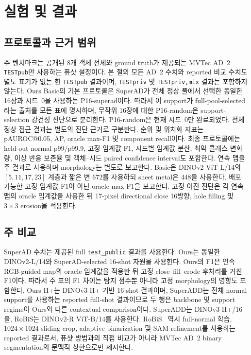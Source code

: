 \section{실험 및 결과}
\label{sec:experiments}


\subsection{프로토콜과 근거 범위}

주 벤치마크는 공개된 8개 객체 전체와 ground truth가 제공되는
MVTec AD~2 \texttt{TESTpub}만 사용하는 퓨샷 설정이다. 본 절의 모든 AD~2
수치와 reported 비교 수치도 별도 표기가 없는 한 \texttt{TESTpub} 결과이며,
\texttt{TESTpriv} 및 \texttt{TESTpriv,mix} 결과는 포함하지 않는다.
Ours Basic의 기본 프로토콜은 SuperAD가 전체 정상 풀에서 선택한 동일한 16장과
시드~0을 사용하는 P16-superad이다. 따라서 이 support가 full-pool-selected라는
출처를 모든 표에 명시하며, 무작위 16장에 대한 P16-random은 support-selection
강건성 진단으로 분리한다. P16-random은 현재 시드~0만 완료되었다. 전체 정상
접근 결과는 별도의 진단 근거로 구분한다. 순위 및
위치화 지표는 pAUROC@0.05, AP, oracle max-F1 및 component recall이다. 최종
프로토콜에는 held-out normal p99/p99.9, 고정 임계값 F1, 시드별 임계값 분산,
최악 클래스 변화량, 이상 반응 보존율 및 객체--시드 paired confidence
interval도 포함한다. 연속 맵을 주 결과로 사용하며 morphology는 별도로
보고한다. Basic은 DINOv2 ViT-L/14의 $[5,11,17,23]$ 계층과 짧은 변 $672$를
사용하되 sheet metal은 $448$을 사용한다. 배포 가능한 고정 임계값 F1이 아닌
oracle max-F1을 보고한다. 고정 이진 진단은 각 연속 맵의 oracle 임계값을 사용한
뒤 17-pixel directional close 16방향, hole filling 및 $3\!\times\!3$ erosion을
적용한다.

\subsection{주 비교}

SuperAD 수치는 제공된 full \texttt{test\_public} 결과를 사용한다. Ours는
동일한 DINOv2-L/14와 SuperAD-selected 16-shot 자원을 사용한다. Ours의 F1은
연속 RGB-guided map의 oracle 임계값을 적용한 뒤 고정 close--fill--erode
후처리를 거친 F1이다. 따라서 주 표의 F1 차이는 탐지 점수뿐 아니라
고정 morphology의 영향도 포함한다. Ours H+는 DINOv3-H+ 기반 16-shot
결과이며, SuperADD는 전체 normal support를 사용하는 reported full-shot 결과이므로
두 행은 backbone 및 support regime이 Ours와 다른 contextual comparison이다.
SuperADD는 DINOv3-H+/16을, RoBiS는 DINOv2-R ViT-B/14를 사용한다.
RoBiS~\cite{li2025robis} 역시 full-normal 학습, $1024\!\times\!1024$ sliding
crop, adaptive binarization 및 SAM refinement를 사용하는 reported 결과로서,
퓨샷 방법과의 직접 비교가 아니라 MVTec AD~2 binary segmentation의 문맥적
상한으로만 제시한다.

